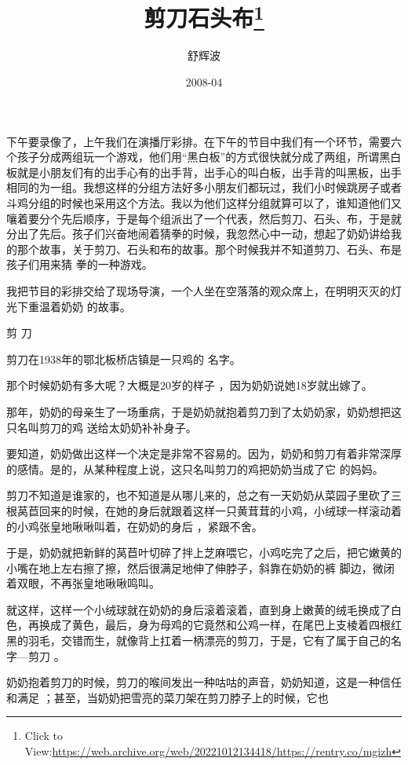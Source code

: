 \documentclass{article}
\title{剪刀石头布\footnote{Click to View:\url{https://web.archive.org/web/20221012134418/https://rentry.co/mgizh}}}
\author{舒辉波}
\date{2008-04}
\begin{document}

\maketitle


\Large

﻿下午要录像了，上午我们在演播厅彩排。在下午的节目中我们有一个环节，需要六个孩子分成两组玩一个游戏，他们用“黑白板”的方式很快就分成了两组，所谓黑白板就是小朋友们有的出手心有的出手背，出手心的叫白板，出手背的叫黑板，出手相同的为一组。我想这样的分组方法好多小朋友们都玩过，我们小时候跳房子或者斗鸡分组的时候也采用这个方法。我以为他们这样分组就算可以了，谁知道他们又嚷着要分个先后顺序，于是每个组派出了一个代表，然后剪刀、石头、布，于是就分出了先后。孩子们兴奋地闹着猜拳的时候，我忽然心中一动，想起了奶奶讲给我的那个故事，关于剪刀、石头和布的故事。那个时候我并不知道剪刀、石头、布是孩子们用来猜
拳的一种游戏。 

\newpage

我把节目的彩排交给了现场导演，一个人坐在空落落的观众席上，在明明灭灭的灯光下重温着奶奶
的故事。 


剪 刀 

剪刀在1938年的鄂北板桥店镇是一只鸡的
名字。 

那个时候奶奶有多大呢？大概是20岁的样子
，因为奶奶说她18岁就出嫁了。 

那年，奶奶的母亲生了一场重病，于是奶奶就抱着剪刀到了太奶奶家，奶奶想把这只名叫剪刀的鸡
送给太奶奶补补身子。 

要知道，奶奶做出这样一个决定是非常不容易的。因为，奶奶和剪刀有着非常深厚的感情。是的，从某种程度上说，这只名叫剪刀的鸡把奶奶当成了它
的妈妈。 

\newpage

剪刀不知道是谁家的，也不知道是从哪儿来的，总之有一天奶奶从菜园子里砍了三根莴苣回来的时候，在她的身后就跟着这样一只黄茸茸的小鸡，小绒球一样滚动着的小鸡张皇地啾啾叫着，在奶奶的身后
，紧跟不舍。 

于是，奶奶就把新鲜的莴苣叶切碎了拌上芝麻喂它，小鸡吃完了之后，把它嫩黄的小嘴在地上左右擦了擦，然后很满足地伸了伸脖子，斜靠在奶奶的裤
脚边，微闭着双眼，不再张皇地啾啾鸣叫。 

就这样，这样一个小绒球就在奶奶的身后滚着滚着，直到身上嫩黄的绒毛换成了白色，再换成了黄色，最后，身为母鸡的它竟然和公鸡一样，在尾巴上支棱着四根红黑的羽毛，交错而生，就像背上扛着一柄漂亮的剪刀，于是，它有了属于自己的名字—剪刀
。 

奶奶抱着剪刀的时候，剪刀的喉间发出一种咕咕的声音，奶奶知道，这是一种信任和满足 ；甚至，当奶奶把雪亮的菜刀架在剪刀脖子上的时候，它也
\newpage
\end{document}
